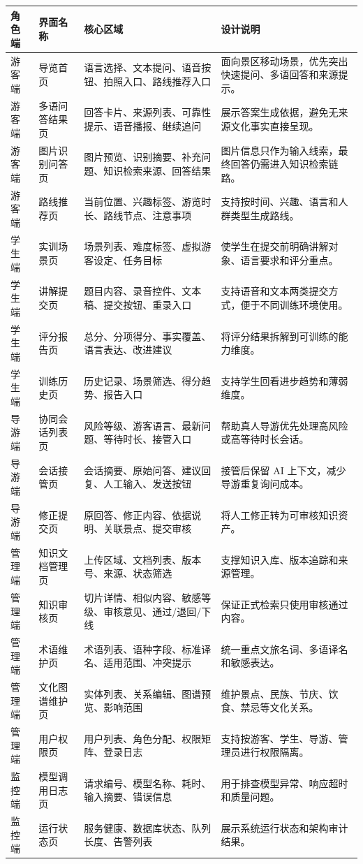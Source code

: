 \begin{longtable}{p{2.4cm}p{3.1cm}p{3.6cm}p{3.9cm}}
\toprule
角色端 & 界面名称 & 核心区域 & 设计说明 \\
\midrule
游客端 & 导览首页 & 语言选择、文本提问、语音按钮、拍照入口、路线推荐入口 & 面向景区移动场景，优先突出快速提问、多语回答和来源提示。 \\
游客端 & 多语问答结果页 & 回答卡片、来源列表、可靠性提示、语音播报、继续追问 & 展示答案生成依据，避免无来源文化事实直接呈现。 \\
游客端 & 图片识别问答页 & 图片预览、识别摘要、补充问题、知识检索来源、回答结果 & 图片信息只作为输入线索，最终回答仍需进入知识检索链路。 \\
游客端 & 路线推荐页 & 当前位置、兴趣标签、游览时长、路线节点、注意事项 & 支持按时间、兴趣、语言和人群类型生成路线。 \\
学生端 & 实训场景页 & 场景列表、难度标签、虚拟游客设定、任务目标 & 使学生在提交前明确讲解对象、语言要求和评分重点。 \\
学生端 & 讲解提交页 & 题目内容、录音控件、文本稿、提交按钮、重录入口 & 支持语音和文本两类提交方式，便于不同训练环境使用。 \\
学生端 & 评分报告页 & 总分、分项得分、事实覆盖、语言表达、改进建议 & 将评分结果拆解到可训练的能力维度。 \\
学生端 & 训练历史页 & 历史记录、场景筛选、得分趋势、报告入口 & 支持学生回看进步趋势和薄弱维度。 \\
导游端 & 协同会话列表页 & 风险等级、游客语言、最新问题、等待时长、接管入口 & 帮助真人导游优先处理高风险或高等待时长会话。 \\
导游端 & 会话接管页 & 会话摘要、原始问答、建议回复、人工输入、发送按钮 & 接管后保留 AI 上下文，减少导游重复询问成本。 \\
导游端 & 修正提交页 & 原回答、修正内容、依据说明、关联景点、提交审核 & 将人工修正转为可审核知识资产。 \\
管理端 & 知识文档管理页 & 上传区域、文档列表、版本号、来源、状态筛选 & 支撑知识入库、版本追踪和来源管理。 \\
管理端 & 知识审核页 & 切片详情、相似内容、敏感等级、审核意见、通过/退回/下线 & 保证正式检索只使用审核通过内容。 \\
管理端 & 术语维护页 & 术语列表、语种字段、标准译名、适用范围、冲突提示 & 统一重点文旅名词、多语译名和敏感表达。 \\
管理端 & 文化图谱维护页 & 实体列表、关系编辑、图谱预览、影响范围 & 维护景点、民族、节庆、饮食、禁忌等文化关系。 \\
管理端 & 用户权限页 & 用户列表、角色分配、权限矩阵、登录日志 & 支持按游客、学生、导游、管理员进行权限隔离。 \\
监控端 & 模型调用日志页 & 请求编号、模型名称、耗时、输入摘要、错误信息 & 用于排查模型异常、响应超时和质量问题。 \\
监控端 & 运行状态页 & 服务健康、数据库状态、队列长度、告警列表 & 展示系统运行状态和架构审计结果。 \\
\bottomrule
\end{longtable}

